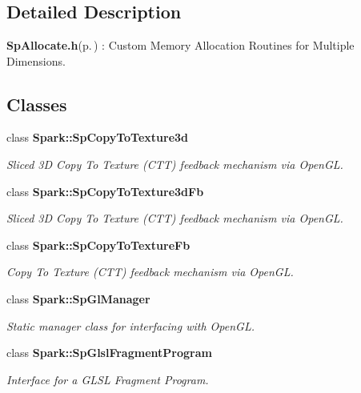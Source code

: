 \section{}
\label{namespaceSpark}


\subsection{Detailed Description}
{\bf Sp\-Allocate.h}{\rm (p.\,\pageref{SpAllocate_8h})} : Custom Memory Allocation Routines for Multiple Dimensions. 



\subsection*{Classes}
\begin{CompactItemize}
\item 
class {\bf Spark::Sp\-Copy\-To\-Texture3d}
\begin{CompactList}\small\item\em Sliced 3D Copy To Texture (CTT) feedback mechanism via Open\-GL. \item\end{CompactList}\item 
class {\bf Spark::Sp\-Copy\-To\-Texture3d\-Fb}
\begin{CompactList}\small\item\em Sliced 3D Copy To Texture (CTT) feedback mechanism via Open\-GL. \item\end{CompactList}\item 
class {\bf Spark::Sp\-Copy\-To\-Texture\-Fb}
\begin{CompactList}\small\item\em Copy To Texture (CTT) feedback mechanism via Open\-GL. \item\end{CompactList}\item 
class {\bf Spark::Sp\-Gl\-Manager}
\begin{CompactList}\small\item\em Static manager class for interfacing with Open\-GL. \item\end{CompactList}\item 
class {\bf Spark::Sp\-Glsl\-Fragment\-Program}
\begin{CompactList}\small\item\em Interface for a GLSL Fragment Program. \item\end{CompactList}\item 

\end{CompactItemize}

